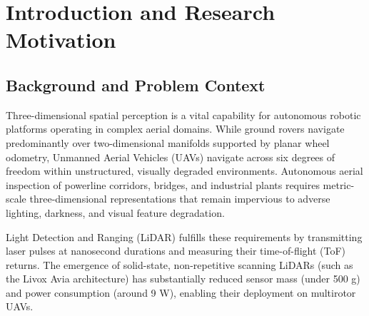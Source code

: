 \documentclass[11pt,a4paper]{report}
\begin{document}
\setcounter{page}{1}

\chapter{Introduction and Research Motivation}

\section{Background and Problem Context}
Three-dimensional spatial perception is a vital capability for autonomous robotic platforms operating in complex aerial domains. While ground rovers navigate predominantly over two-dimensional manifolds supported by planar wheel odometry, Unmanned Aerial Vehicles (UAVs) navigate across six degrees of freedom within unstructured, visually degraded environments. Autonomous aerial inspection of powerline corridors, bridges, and industrial plants requires metric-scale three-dimensional representations that remain impervious to adverse lighting, darkness, and visual feature degradation.

Light Detection and Ranging (LiDAR) fulfills these requirements by transmitting laser pulses at nanosecond durations and measuring their time-of-flight (ToF) returns. The emergence of solid-state, non-repetitive scanning LiDARs (such as the Livox Avia architecture) has substantially reduced sensor mass (under 500 g) and power consumption (around 9 W), enabling their deployment on multirotor UAVs.
\end{document}
